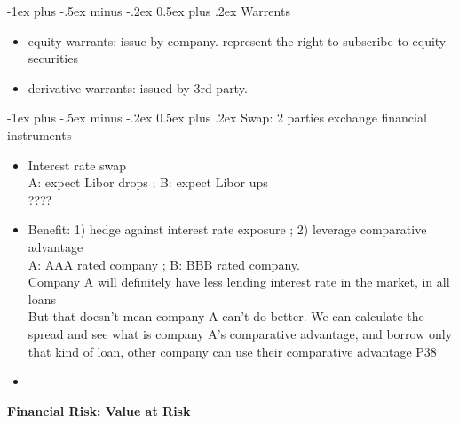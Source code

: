 \documentclass[10pt,landscape]{article}
\makeatletter
\renewcommand{\section}{\@startsection{section}{1}{0mm}%
                                {-1ex plus -.5ex minus -.2ex}%
                                {0.5ex plus .2ex}%
                                {\normalfont\large\bfseries}}
\makeatother
\begin{document}
\begin{multicols}{2}
\begin{itemize}
\end{itemize}

\section{Warrents}
\begin{itemize}
	\item equity warrants: issue by company. represent the right to subscribe to equity securities
	\item derivative warrants: issued by 3rd party.
\end{itemize}

\section{Swap: 2 parties exchange financial instruments}
\begin{itemize}
	\item Interest rate swap\\
			A: expect Libor drops ; B: expect Libor ups\\
			????
	\item Benefit: 1) hedge against interest rate exposure ; 2) leverage comparative advantage\\
			A: AAA rated company ; B: BBB rated company.\\
			Company A will definitely have less lending interest rate in the market, in all loans\\
			But that doesn't mean company A can't do better. We can calculate the spread and see what is company A's comparative advantage, and borrow only that kind of loan, other company can use their comparative advantage P38
	\item 
\end{itemize}


\end{multicols}







\newpage

\begin{center}
     \Large{\textbf{Financial Risk: Value at Risk}} \\
\end{center}\\
\end{document}

